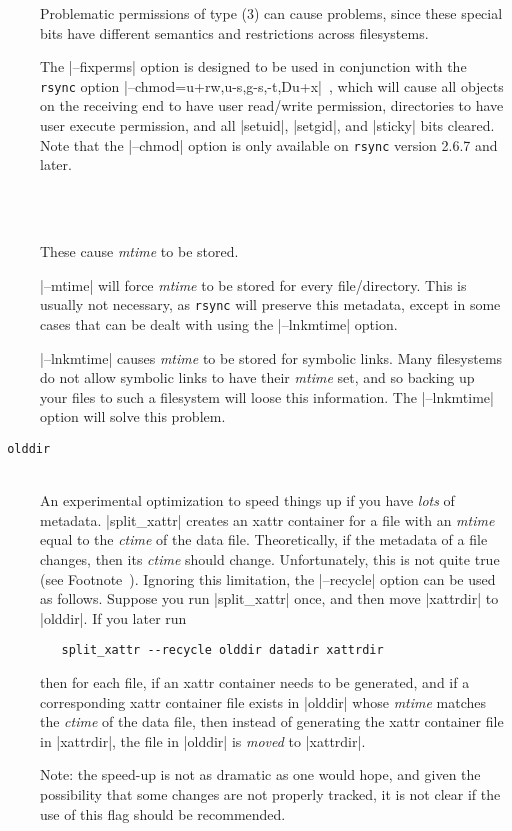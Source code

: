 \documentclass[11pt]{article}
\newcounter{fncnt}
\begin{document}
\begin{description}
Problematic permissions of type (3) can cause problems, since
these special bits have different semantics and restrictions
across filesystems.

The |--fixperms| option is designed to be used in conjunction with
the \texttt{rsync} option |--chmod=u+rw,u-s,g-s,-t,Du+x|\ ,
which will cause all objects on the receiving end
to have user read/write permission, directories to have user execute
permission, and all |setuid|, |setgid|, and |sticky| bits cleared.
Note that the |--chmod| option is only available on \texttt{rsync}
version 2.6.7 and later.

\item[{\tt \pmb{{-}{-}mtime}}] \ \\[-3ex]
\item[{\tt \pmb{{-}{-}lnkmtime}}] \ \\
These cause \emph{mtime} to be stored.

|--mtime| will force \emph{mtime} to be stored for every
file/directory.
This is usually not necessary, as \texttt{rsync} will preserve this metadata,
except in some cases that can be dealt with using the |--lnkmtime| option.

|--lnkmtime| causes \emph{mtime} to be stored for symbolic links.
Many filesystems do not allow symbolic links to have their 
\emph{mtime} set, and so backing up your files to such a filesystem
will loose this information.
The |--lnkmtime| option will solve this problem.



\item[{\tt\pmb{{-}{-}recycle} olddir}] \ \\
An experimental optimization to speed things up if you
have \emph{lots} of metadata.  |split_xattr| creates an xattr container
for a file with an \emph{mtime} equal to the \emph{ctime} of the data file.
Theoretically, if the metadata of a file changes, then its \emph{ctime}
should change.  Unfortunately, this is not quite true (see Footnote~\thefncnt).
Ignoring this limitation,
the |--recycle| option can be used as follows.  Suppose you 
run |split_xattr| once, and then move |xattrdir| to |olddir|.
If you later run
\begin{Verbatim}
   split_xattr --recycle olddir datadir xattrdir
\end{Verbatim}
then for each file, if an xattr container needs to be generated,
and if a corresponding xattr container file exists in |olddir|
whose \emph{mtime} matches the \emph{ctime} of the data file, then instead
of generating the xattr container file in |xattrdir|,
the file in |olddir| is \emph{moved} to |xattrdir|.

Note: the speed-up is not as dramatic as one would hope, and given
the possibility that some changes are not properly tracked,
it is not clear if the use of this flag should be recommended.
\end{description}
\end{document}
